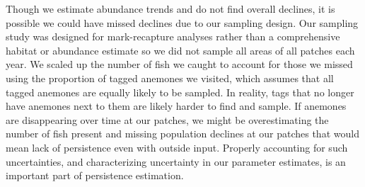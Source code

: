 \documentclass[12pt, oneside]{article}   	%
\begin{document}
Though we estimate abundance trends and do not find overall declines, it is possible we could have missed declines due to our sampling design. Our sampling study was designed for mark-recapture analyses rather than a comprehensive habitat or abundance estimate so we did not sample all areas of all patches each year. We scaled up the number of fish we caught to account for those we missed using the proportion of tagged anemones we visited, which assumes that all tagged anemones are equally likely to be sampled. In reality, tags that no longer have anemones next to them are likely harder to find and sample. If anemones are disappearing over time at our patches, we might be overestimating the number of fish present and missing population declines at our patches that would mean lack of persistence even with outside input. Properly accounting for such uncertainties, and characterizing uncertainty in our parameter estimates, is an important part of persistence estimation.

\end{document}
